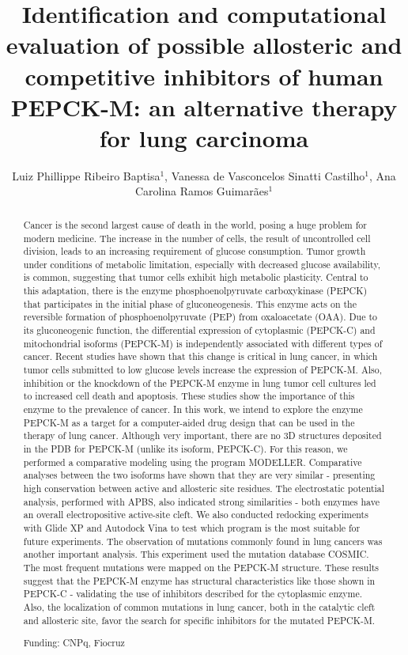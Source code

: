 \documentclass[twoside]{article}
\title{\vspace{-15mm}\fontsize{24pt}{10pt}\selectfont\textbf{Identification and computational evaluation of possible allosteric and competitive inhibitors of human PEPCK-M: an alternative therapy for lung carcinoma}} %
\author{Luiz Phillippe Ribeiro Baptisa$^1$, Vanessa de Vasconcelos Sinatti Castilho$^1$, Ana Carolina Ramos Guimar\~aes$^1$}
\affil{1 FIOCRUZ-IOC\\ }
\date{}
\begin{document}
\maketitle %

\thispagestyle{fancy} %


\begin{abstract}
Cancer is the second largest cause of death in the world, posing a huge problem for modern medicine. The increase in the number of cells, the result of uncontrolled cell division, leads to an increasing requirement of glucose consumption. Tumor growth under conditions of metabolic limitation, especially with decreased glucose availability, is common, suggesting that tumor cells exhibit high metabolic plasticity. Central to this adaptation, there is the enzyme phosphoenolpyruvate carboxykinase (PEPCK) that participates in the initial phase of gluconeogenesis. This enzyme acts on the reversible formation of phosphoenolpyruvate (PEP) from oxaloacetate (OAA). Due to its gluconeogenic function, the differential expression of cytoplasmic (PEPCK-C) and mitochondrial isoforms (PEPCK-M) is independently associated with different types of cancer. Recent studies have shown that this change is critical in lung cancer, in which tumor cells submitted to low glucose levels increase the expression of PEPCK-M. Also, inhibition or the knockdown of the PEPCK-M enzyme in lung tumor cell cultures led to increased cell death and apoptosis. These studies show the importance of this enzyme to the prevalence of cancer. In this work, we intend to explore the enzyme PEPCK-M as a target for a computer-aided drug design that can be used in the therapy of lung cancer. Although very important, there are no 3D structures deposited in the PDB for PEPCK-M (unlike its isoform, PEPCK-C). For this reason, we performed a comparative modeling using the program MODELLER. Comparative analyses between the two isoforms have shown that they are very similar - presenting high conservation between active and allosteric site residues. The electrostatic potential analysis, performed with APBS, also indicated strong similarities - both enzymes have an overall electropositive active-site cleft. We also conducted redocking experiments with Glide XP and Autodock Vina to test which program is the most suitable for future experiments. The observation of mutations commonly found in lung cancers was another important analysis. This experiment used the mutation database COSMIC. The most frequent mutations were mapped on the PEPCK-M structure. These results suggest that the PEPCK-M enzyme has structural characteristics like those shown in PEPCK-C - validating the use of inhibitors described for the cytoplasmic enzyme. Also, the localization of common mutations in lung cancer, both in the catalytic cleft and allosteric site, favor the search for specific inhibitors for the mutated PEPCK-M.

Funding: CNPq, Fiocruz
\end{abstract}
\end{document}
